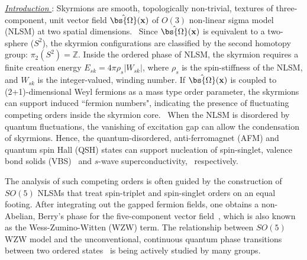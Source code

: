 \documentclass[aps,prb,amsmath,amssymb,floatfix,twocolumn]{revtex4}
\begin{document}
\underline{\emph{Introduction} }: Skyrmions are smooth, topologically non-trivial, textures of three-component, unit vector field $\hat{\bs{\Omega}}(\mathbf{x})$ of $O(3)$ non-linear sigma model (NLSM) at two spatial dimensions.~\cite{Rajaraman} Since $\hat{\bs{\Omega}}(\mathbf{x})$ is equivalent to a two-sphere ($S^2$), the skyrmion configurations are classified by the second homotopy group: $\pi_2(S^2)=\mathbb{Z}$. 
Inside the ordered phase of NLSM, the skyrmion requires a finite creation energy $E_{sk} = 4\pi \rho_s |W_{sk}|$, where $\rho_s$ is the spin-stiffness of the NLSM, and $W_{sk}$ is the integer-valued, winding number. If $\hat{\bs{\Omega}}(\mathbf{x})$ is coupled to (2+1)-dimensional Weyl fermions as a mass type order parameter, the skyrmions can support induced ``fermion numbers", indicating the presence of fluctuating competing orders inside the skyrmion core.~\cite{Wilczek1, Jaroszewicz1, Jaroszewicz2, Wilczek2, Abanov, TanakaHu, FisherSenthil, Grover, YaoLee, FuSachdev, RoyHerbut, Herbut1, Moon, Chakravarty1, GoswamiSi2, GoswamiSi3,GoswamiSi4} When the NLSM is disordered by quantum fluctuations, the vanishing of excitation gap can allow the condensation of skyrmions. Hence, the quantum-disordered, anti-ferromagnet (AFM) and quantum spin Hall (QSH) states can support nucleation of spin-singlet, valence bond solids (VBS)~\cite{FisherSenthil} and $s$-wave superconductivity,~\cite{Grover,Herbut1,Moon,Chakravarty1} respectively.  

The analysis of such competing orders is often guided by the construction of $SO(5)$ NLSMs that treat spin-triplet and spin-singlet orders on an equal footing. After integrating out the gapped fermion fields, one obtains a non-Abelian, Berry's phase for the five-component vector field~\cite{Abanov,TanakaHu, FisherSenthil, Grover, YaoLee, FuSachdev, RoyHerbut, Herbut1, Moon, Chakravarty1, GoswamiSi2}, which is also known as the Wess-Zumino-Witten (WZW) term. The relationship between $SO(5)$ WZW model and the unconventional, continuous quantum phase transitions between two ordered states~\cite{Senthiletal2} is being actively studied by many groups.~\cite{Chalker1,CWang,ZWang} 
\end{document}
